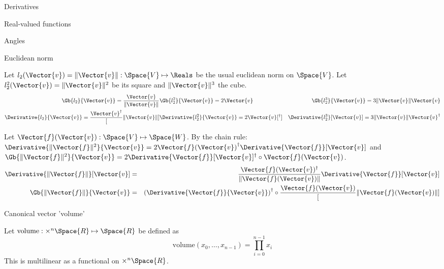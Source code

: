 \begin{plSection}{Derivatives}
\begin{plSection}{Real-valued functions}
\begin{plSection}{Angles}
\end{plSection}%
\begin{plSection}{Euclidean norm}
\label{sec:derivatives-of-euclidean-norm}

Let $l_2(\Vector{v}) = \| \Vector{v}  \|: \Space{V} \mapsto \Reals$
be the usual euclidean norm on $\Space{V}$.
Let $l_2^2(\Vector{v}) = \| \Vector{v}  \|^2 $
be its square and $ \| \Vector{v}  \|^3$ the cube.
\begin{eqnarray}
\label{eq:l2-gradient}
\Gb{l_2}{\Vector{v}} = \frac{ \Vector{v} }{ \| \Vector{v}  \|} &
\Gb{l_2^2}{\Vector{v}} =  2\Vector{v} &
\Gb{l_2^3}{\Vector{v}} = 3 \| \Vector{v}  \| \Vector{v} \\
\Derivative{l_2}{\Vector{v}} = \frac{ \Vector{v}^\dagger }[ \| \Vector{v}  \|] &
\Derivative{l_2^2}{\Vector{v}} = 2\Vector{v}[^\dagger] &
\Derivative{l_2^3}[\Vector{v}] 
= 3 \| \Vector{v}  \| \Vector{v}^\dagger \nonumber
\end{eqnarray}

Let $\Vector{f}(\Vector{v}) : \Space{V} \mapsto \Space{W}$.
By the chain rule:
$\Derivative{\| \Vector{f} \|^2}{\Vector{v}}  
=  2 {\Vector{f}(\Vector{v})}^{\dagger} 
\Derivative{\Vector{f}}[\Vector{v}] $
and
$\Gb{\| \Vector{f} \|^2}{\Vector{v}}  
=  2 \Derivative{\Vector{f}}[\Vector{v}]^\dagger 
\circ \Vector{f}(\Vector{v})$.
\begin{eqnarray}
\label{eq:norm_derivative}
\Derivative{\| \Vector{f} \|}[\Vector{v}]
& = &
\frac{\Vector{f}(\Vector{v})^\dagger}{\| \Vector{f}(\Vector{v}) \|} \Derivative{\Vector{f}}[\Vector{v}]  \\
\Gb{\| \Vector{f} \|}{\Vector{v}}
& = &
\left(\Derivative{\Vector{f}}{\Vector{v}}\right)^\dagger \circ  \frac{\Vector{f}(\Vector{v})}[ \| \Vector{f}(\Vector{v})  \|]
\label{eq:norm_gradient}
\end{eqnarray}

\end{plSection}%
\begin{plSection}{Canonical vector 'volume'}
\label{sec:Derivative-of-canonical-vector-volume}

Let $\text{volume} : \times^{n} \Space{R} \mapsto \Space{R}$ 
be defined as
\begin{equation}
\text{volume} \left( x_0 , \ldots , x_{n-1} \right) = \prod_{i=0}^{n-1} x_i
\end{equation}
This is multilinear as a functional on $\times^{n} \Space{R}$.


\end{plSection}
\end{plSection}
\end{plSection}
